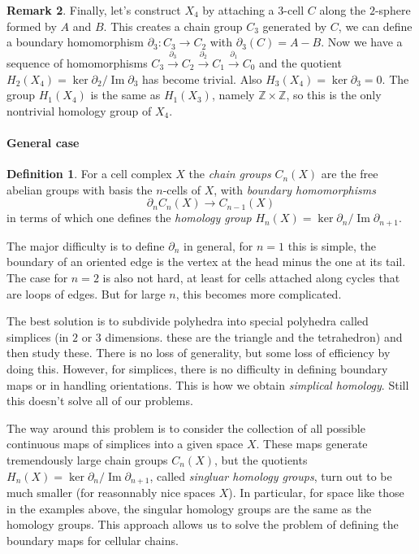 \documentclass[11pt,a4paper]{article}
\theoremstyle{definition}
\newtheorem{definition}{Definition}[section]
\newtheorem{remark}[definition]{Remark}
\theoremstyle{plain}
\theoremstyle{remark}
\begin{document}
\begin{remark}
Finally, let's construct $X_4$ by attaching a $3$-cell $C$ along the $2$-sphere formed by $A$ and $B$. 
This creates a chain group $C_3$ generated by $C$, we can define a boundary homomorphism $\partial_3 \colon C_3 \to C_2$ with $\partial_3(C) = A - B$.
Now we have a sequence of homomorphisms $C_3 \xrightarrow{\partial_3} C_2 \xrightarrow{\partial_2} C_1 \xrightarrow{\partial_1} C_0$ 
and the quotient $H_2(X_4) = \ker \partial_2 / \operatorname{Im} \partial_3$ has become trivial. Also $H_3(X_4) = \ker \partial_3 = 0$. 
The group $H_1(X_4)$ is the same as $H_1(X_3)$, namely $\mathbb{Z} \times \mathbb{Z}$, so this is the only nontrivial homology group of $X_4$. 

\paragraph{General case}
\begin{definition}
  For a cell complex $X$ the \emph{chain groups} $C_n(X)$ are the free abelian groups with basis the $n$-cells of $X$, with \emph{boundary homomorphisms} 
  $$\partial_n C_n(X) \to C_{n-1} (X)$$
  in terms of which one defines the \emph{homology group} $H_n(X) = \ker \partial_n / \operatorname{Im} \partial_{n+1}$. 
\end{definition}

The major difficulty is to define $\partial_n$ in general, for $n = 1$ this is simple, the boundary of an oriented edge is the vertex at the head 
minus the one at its tail. The case for $n = 2$ is also not hard, at least for cells attached along cycles that are loops of edges. But for large $n$, 
this becomes more complicated. 

The best solution is to subdivide polyhedra into special polyhedra called simplices (in $2$ or $3$ dimensions. these are the triangle and 
the tetrahedron) and then study these. There is no loss of generality, but some loss of efficiency by doing this. 
However, for simplices, there is no difficulty in defining boundary maps or in handling orientations. This is how we obtain \emph{simplical 
homology}. Still this doesn't solve all of our problems.

The way around this problem is to consider the collection of all possible continuous maps of simplices into a given space $X$. 
These maps generate tremendously large chain groups $C_n(X)$, but the quotients $H_n(X) = \ker \partial_n / \operatorname{Im} \partial_{n+1}$, 
called \emph{singluar homology groups}, turn out to be much smaller (for reasonnably nice spaces $X$). In particular, for space like those in the examples above, 
the singular homology groups are the same as the homology groups. This approach allows us to solve the problem 
of defining the boundary maps for cellular chains. 


\end{remark}
\end{document}
